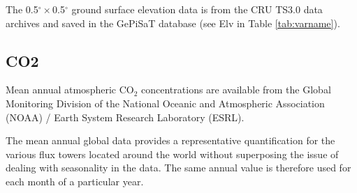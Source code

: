 The 0.5$^{\circ}\times$0.5$^{\circ}$ ground surface elevation data is from the CRU TS3.0 data archives and saved in the GePiSaT database (see Elv in Table \ref{tab:varname}).

\subsection{CO2}
\label{sec:gepnoaa}
Mean annual atmospheric CO$_2$ concentrations are available from the Global Monitoring Division of the National Oceanic and Atmospheric Association (NOAA) / Earth System Research Laboratory (ESRL)\footnotemark {}.  

The mean annual global data provides a representative quantification for the various flux towers located around the world without superposing the issue of dealing with seasonality in the data.
The same annual value is therefore used for each month of a particular year.

